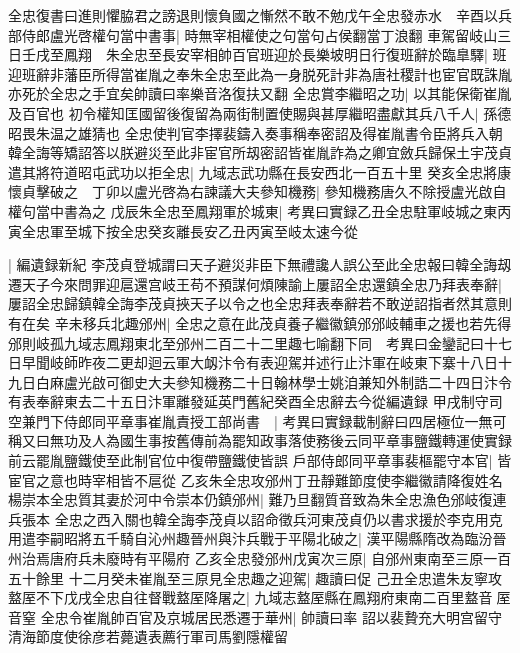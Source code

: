 全忠復書曰進則懼脇君之謗退則懷負國之慚然不敢不勉戊午全忠發赤水　辛酉以兵部侍郎盧光啓權句當中書事|{
	時無宰相權使之句當句占侯翻當丁浪翻}
車駕留岐山三日壬戌至鳳翔　朱全忠至長安宰相帥百官班迎於長樂坡明日行復班辭於臨臯驛|{
	班迎班辭非藩臣所得當崔胤之奉朱全忠至此為一身脱死計非為唐社稷計也宦官既誅胤亦死於全忠之手宜矣帥讀曰率樂音洛復扶又翻}
全忠賞李繼昭之功|{
	以其能保衛崔胤及百官也}
初令權知匡國留後復留為兩街制置使賜與甚厚繼昭盡獻其兵八千人|{
	孫德昭畏朱温之雄猜也}
全忠使判官李擇裴鑄入奏事稱奉密詔及得崔胤書令臣將兵入朝韓全誨等矯詔答以朕避災至此非宦官所刼密詔皆崔胤詐為之卿宜斂兵歸保土宇茂貞遣其將符道昭屯武功以拒全忠|{
	九域志武功縣在長安西北一百五十里}
癸亥全忠將康懷貞擊破之　丁卯以盧光啓為右諫議大夫參知機務|{
	參知機務唐久不除授盧光啟自權句當中書為之}
戊辰朱全忠至鳳翔軍於城東|{
	考異曰實録乙丑全忠駐軍岐城之東丙寅全忠軍至城下按全忠癸亥離長安乙丑丙寅至岐太速今從}


|{
	編遺録新紀}
李茂貞登城謂曰天子避災非臣下無禮讒人誤公至此全忠報曰韓全誨刼遷天子今來問罪迎扈還宫岐王苟不預謀何煩陳諭上屢詔全忠還鎮全忠乃拜表奉辭|{
	屢詔全忠歸鎮韓全誨李茂貞挾天子以令之也全忠拜表奉辭若不敢逆詔指者然其意則有在矣}
辛未移兵北趣邠州|{
	全忠之意在此茂貞養子繼徽鎮邠邠岐輔車之援也若先得邠則岐孤九域志鳳翔東北至邠州二百二十二里趣七喻翻下同　考異曰金鑾記曰十七日早聞岐師昨夜二更却迴云軍大衂汴令有表迎駕并述行止汴軍在岐東下寨十八日十九日白麻盧光啟可御史大夫參知機務二十日翰林學士姚洎兼知外制誥二十四日汴令有表奉辭東去二十五日汴軍離發延英門舊紀癸酉全忠辭去今從編遺録}
甲戌制守司空兼門下侍郎同平章事崔胤責授工部尚書　|{
	考異曰實録載制辭曰四居極位一無可稱又曰無功及人為國生事按舊傳前為罷知政事落使務後云同平章事鹽鐵轉運使實録前云罷胤鹽鐵使至此制官位中復帶鹽鐵使皆誤}
戶部侍郎同平章事裴樞罷守本官|{
	皆宦官之意也時宰相皆不扈從}
乙亥朱全忠攻邠州丁丑靜難節度使李繼徽請降復姓名楊崇本全忠質其妻於河中令崇本仍鎮邠州|{
	難乃旦翻質音致為朱全忠漁色邠岐復連兵張本}
全忠之西入關也韓全誨李茂貞以詔命徵兵河東茂貞仍以書求援於李克用克用遣李嗣昭將五千騎自沁州趣晉州與汴兵戰于平陽北破之|{
	漢平陽縣隋改為臨汾晉州治焉唐府兵未廢時有平陽府}
乙亥全忠發邠州戊寅次三原|{
	自邠州東南至三原一百五十餘里}
十二月癸未崔胤至三原見全忠趣之迎駕|{
	趣讀曰促}
己丑全忠遣朱友寧攻盩厔不下戊戌全忠自往督戰盩厔降屠之|{
	九域志盩厔縣在鳳翔府東南二百里盩音厔音窒}
全忠令崔胤帥百官及京城居民悉遷于華州|{
	帥讀曰率}
詔以裴贄充大明宫留守清海節度使徐彦若薨遺表薦行軍司馬劉隱權留

